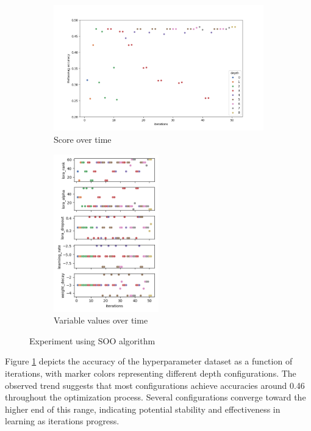 \documentclass[runningheads]{llncs}
\begin{document}
\begin{figure}[h!]
    \centering
    \begin{subfigure}[b]{.5\textwidth}
      \centering
      \includegraphics[width = \textwidth]{figures/soo/score_evolution.png}
      \caption{Score over time}
      \label{fig:soo_score_time}
    \end{subfigure}%
    \begin{subfigure}[b]{.4\textwidth}
      \centering
      \includegraphics[width = 0.5\textwidth]{figures/soo/variables_evolution.png}
      \caption{Variable values over time}
      \label{fig:soo_var_time}
    \end{subfigure}
    \caption{Experiment using SOO algorithm}
    \label{fig:soo_res}
\end{figure}


Figure \ref{fig:soo_score_time} depicts the accuracy of the hyperparameter dataset as a function of iterations, with marker colors representing different depth configurations. The observed trend suggests that most configurations achieve accuracies around 0.46 throughout the optimization process. Several configurations converge toward the higher end of this range, indicating potential stability and effectiveness in learning as iterations progress. 
\end{document}

